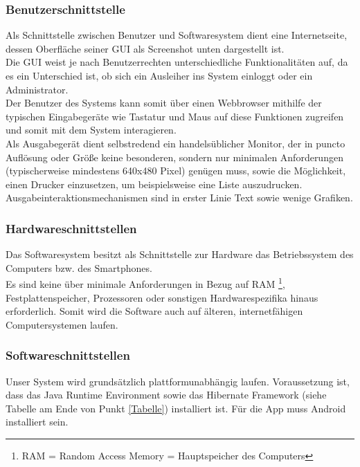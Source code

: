 \documentclass[fontsize=12pt,paper=a4,twoside]{scrartcl}
\begin{document}
\subsubsection{Benutzerschnittstelle}

Als Schnittstelle zwischen Benutzer und Softwaresystem dient eine Internetseite, dessen Oberfläche 
seiner GUI als Screenshot unten dargestellt ist. \\
Die GUI weist je nach Benutzerrechten unterschiedliche Funktionalitäten auf, da es ein Unterschied ist, 
ob sich ein Ausleiher ins System einloggt oder ein Administrator. \\
Der Benutzer des Systems kann somit über einen Webbrowser mithilfe der typischen Eingabegeräte wie 
Tastatur und Maus auf diese Funktionen zugreifen und somit mit dem System interagieren. \\
Als Ausgabegerät dient selbstredend ein handelsüblicher Monitor, der in puncto Auflösung oder Größe 
keine besonderen, sondern nur minimalen Anforderungen (typischerweise mindestens 640x480 Pixel) 
genügen muss, sowie die Möglichkeit, einen Drucker einzusetzen, um beispielsweise eine Liste 
auszudrucken. \\
Ausgabeinteraktionsmechanismen sind in erster Linie Text sowie wenige Grafiken. 

\subsubsection{Hardwareschnittstellen} \label{hardware}
Das Softwaresystem besitzt als Schnittstelle zur Hardware das Betriebssystem des Computers bzw. des 
Smartphones. \\
  Es sind keine über minimale Anforderungen in Bezug auf RAM
  \footnote{RAM = Random Access Memory = Hauptspeicher des Computers}, Festplattenspeicher, 
  Prozessoren oder sonstigen Hardwarespezifika hinaus erforderlich. Somit wird die Software auch auf 
  älteren, internetfähigen Computersystemen laufen. \\
 
\subsubsection{Softwareschnittstellen} \label{software}

Unser System wird grundsätzlich plattformunabhängig laufen. Voraussetzung ist, dass das Java Runtime 
Environment sowie das Hibernate Framework (siehe Tabelle am Ende von Punkt \ref{Tabelle}) installiert 
ist. Für die App muss Android installiert sein. \\
\end{document}
